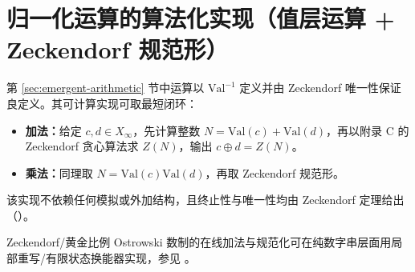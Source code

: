 \section{归一化运算的算法化实现（值层运算 + Zeckendorf 规范形）}

第 \ref{sec:emergent-arithmetic} 节中运算以 $\mathrm{Val}^{-1}$ 定义并由 Zeckendorf 唯一性保证良定义。其可计算实现可取最短闭环：
\begin{itemize}
  \item \textbf{加法：}给定 $c,d\in X_\infty$，先计算整数 $N=\mathrm{Val}(c)+\mathrm{Val}(d)$，再以附录 C 的 Zeckendorf 贪心算法求 $Z(N)$，输出 $c\oplus d=Z(N)$。
  \item \textbf{乘法：}同理取 $N=\mathrm{Val}(c)\mathrm{Val}(d)$，再取 Zeckendorf 规范形。
\end{itemize}
该实现不依赖任何模拟或外加结构，且终止性与唯一性均由 Zeckendorf 定理给出（\cite{Zeckendorf1972}）。

\begin{remark}\label{rem:zeckendorf-normalize-fst}
Zeckendorf/黄金比例 Ostrowski 数制的在线加法与规范化可在纯数字串层面用局部重写/有限状态换能器实现，参见 \cite{Frougny1992NumbersAutomata,Frougny1999OnlineAddition,AhlbachUsatineFrougnyPippenger2013,HieronymiTerry2018OstrowskiAddition}。
\end{remark}
